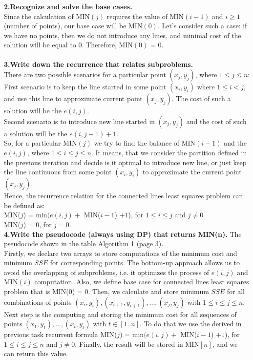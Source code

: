 \documentclass[11pt]{article}
\begin{document}
\noindent \textbf{2.Recognize and solve the base cases.}\\
Since the calculation of MIN$(j)$ requires the value of MIN$(i-1)$ and $i \geq 1$ (number of points), our base case will be MIN$(0)$. Let's consider such a case: if we have no points, then we do not introduce any lines, and minimal cost of the solution will be equal to 0. Therefore, MIN$(0)$ = 0.\\
\\
\noindent \textbf{3.Write down the recurrence that relates subproblems.}\\ 
There are two possible scenarios for a particular point $(x_{j},y_{j})$, where $1 \leq j \leq n$:\\
\noindent First scenario is to keep the line started in some point $(x_{i},y_{i})$ where $1 \leq i < j$, and use this line to approximate current point $(x_{j},y_{j})$. The cost of such a solution will be the $e(i,j)$.\\
\noindent Second scenario is to introduce new line started in $(x_{j},y_{j})$ and the cost of such a solution will be the $e(i,j-1)+1$.\\
\noindent So, for a particular MIN$(j)$ we try to find the balance of MIN$(i-1)$ and the $e(i, j)$, where $1\leq i \leq j \leq n$. It means, that we consider the partition defined in the previous iteration and decide is it optimal to introduce new line, or just keep the line continuous from some point $(x_{i},y_{i})$ to approximate the current point $(x_{j},y_{j})$.\\
\noindent  Hence, the recurrence relation for the connected lines least squares problem can be defined as:\\
MIN($j$) = min$(e(i,j) +$ MIN($i-1$) $+1$), for $1\leq i \leq j$ and $j\neq0$\\
MIN($j$) = $0$, for $j = 0$.
\\

\noindent \textbf{4.Write the pseudocode (always using DP) that returns MIN(n).}
The pseudocode shown in the table Algorithm 1 (page 3).\\ 
\noindent Firstly, we declare two arrays to store computations of the minimum cost and minimum $SSE$ for corresponding points. The bottom-up approach allows us to avoid the overlapping of subproblems, i.e. it optimizes the process of $e(i,j)$ and MIN$(i)$ computation. Also, we define base case for connected lines least squares problem that is MIN($0$) = $0$. Then, we calculate and store minimum $SSE$ for all combinations of points $(x_{i},y_{i}), (x_{i+1},y_{i+1}), ...,(x_{j},y_{j})$ with $1\leq i \leq j \leq n$. Next step is the computing and storing the minimum cost for all sequences of points $(x_{1},y_{1}), ...,(x_{t},y_{t})$ with $t\in[1..n]$. To do that we use the derived in previous task recurrent formula MIN($j$) = min$(e(i,j) +$ MIN($i-1$) $+1$), for $1\leq i \leq j \leq n$ and $j\neq0$. Finally, the result will be stored in MIN$[n]$, and we can return this value.\\
\end{document}
